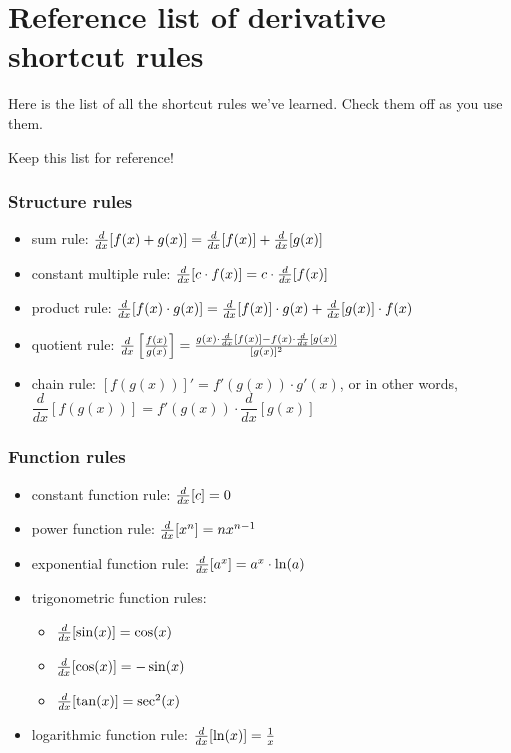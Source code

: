 \section{Reference list of derivative shortcut rules}

Here is the list of all the shortcut rules we've learned. Check them off as you use them. 

Keep this list for reference!
{ \everymath{\displaystyle}
    \subsubsection*{Structure rules}
    \begin{itemize}[label=\(\square\)]
        \item sum rule: $\frac{d}{dx}[f(x)+g(x)] = \frac{d}{dx}[f(x)]+\frac{d}{dx}[g(x)]$ 
        \item constant multiple rule: $\frac{d}{dx}[c\cdot f(x)] = c\cdot\frac{d}{dx}[f(x)]$
        
        \item product rule: $\frac{d}{dx}[f(x) \cdot g(x)] = \frac{d}{dx}[f(x)] \cdot g(x) + \frac{d}{dx}[g(x)] \cdot f(x)$
        \item quotient rule: $\frac{d}{dx}\left[\frac{f(x)}{g(x)}\right] 
        = \frac{g(x) \cdot \frac{d}{dx}[f(x)] - f(x) \cdot \frac{d}{dx}[g(x)]}{[g(x)]^2}$
        \item chain rule: $[f(g(x))]' = f'(g(x)) \cdot g'(x)$, or in other words, $\dfrac{d}{dx}\left[ f(g(x)) \right] = f'(g(x)) \cdot \dfrac{d}{dx}\left[ g(x) \right]$
        
    \end{itemize}

    \begin{minipage}{0.55\textwidth}
        \subsubsection*{Function rules}
        \begin{itemize}[label=\(\square\)]
            \item constant function rule: $\frac{d}{dx}[c] = 0$
            \item power function rule: $\frac{d}{dx}[x^n] = nx^{n-1}$
            \item exponential function rule: $\frac{d}{dx}[a^x] = a^x\cdot\ln(a)$
            \item[] trigonometric function rules: 
            \begin{itemize}[label=\(\bigcirc\)]
                \item $\frac{d}{dx}[\sin(x)] = \cos(x)$
                \item $\frac{d}{dx}[\cos(x)] = -\sin(x)$
                \item $\frac{d}{dx}[\tan(x)] = \sec^2(x)$
            \end{itemize}
            \item logarithmic function rule: $\frac{d}{dx}[\ln(x)] = \frac{1}{x}$
        \end{itemize}
    \end{minipage}
    }
